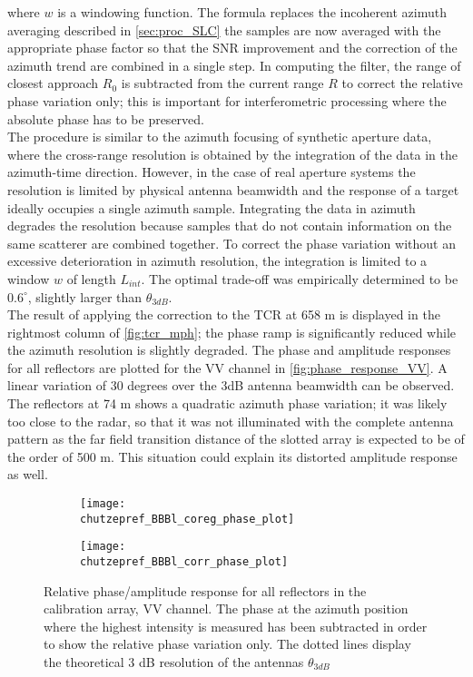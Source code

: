 where $w$ is a windowing function. The formula replaces the incoherent azimuth averaging described in \autoref{sec:proc_SLC} the samples are now averaged with the appropriate phase factor so that the SNR improvement and the correction of the azimuth trend are combined in a single step. In computing the filter, the range of closest approach $R_{0}$ is subtracted from the current range $R$ to correct the relative phase variation only; this is important for interferometric processing where the absolute phase has to be preserved.\\
The procedure is similar to the azimuth focusing of synthetic aperture data, where the cross-range resolution is obtained by the integration of the data in the azimuth-time direction. However, in the case of real aperture systems the resolution is limited by  physical antenna beamwidth and the response of a target ideally occupies a single azimuth sample. Integrating the data in azimuth degrades the resolution because samples that do not contain information on the same scatterer are combined together. To correct the phase variation without an excessive deterioration in azimuth resolution, the integration is limited to a window  $w$ of length $L_{int}$. The optimal trade-off was empirically determined to be $0.6^\circ$, slightly larger than $\theta_{3dB}$.\\
The result of applying the correction to the TCR at 658 m is displayed in the rightmost column of \autoref{fig:tcr_mph}; the phase ramp is significantly reduced while the azimuth resolution is slightly degraded.
The phase and amplitude responses for all reflectors are plotted for the VV channel in \autoref{fig:phase_response_VV}. A linear variation of 30 degrees over the 3dB antenna beamwidth can be observed. The reflectors at 74 m shows a quadratic azimuth phase variation; it was likely too close to the radar, so that it was not illuminated with the complete antenna pattern as the far field transition distance of the slotted array is expected to be of the order of 500 m. This situation could explain its distorted amplitude response as well. 
\begin{figure}[ht]
	\begin{subfigure}[t]{\columnwidth}
		\texttt{[image: \\chutzepref\_BBBl\_coreg\_phase\_plot]}
	\end{subfigure}
	\begin{subfigure}[t]{\columnwidth}
		\texttt{[image: \\chutzepref\_BBBl\_corr\_phase\_plot]}
	\end{subfigure}
	\caption{Relative phase/amplitude response for all reflectors in the calibration array, VV channel. The phase at the azimuth position where the highest intensity is measured has been subtracted in order to show the relative phase variation only. The dotted lines display the theoretical 3 dB resolution of the antennas $\theta_{3dB}$}
	\label{fig:phase_response_VV}
\end{figure}
